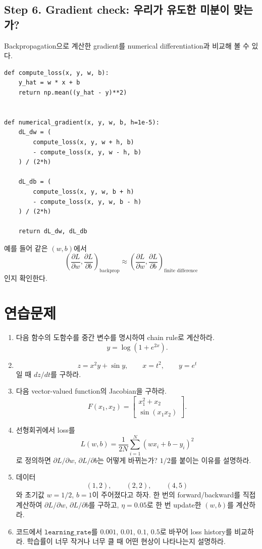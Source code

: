\documentclass[11pt,a4paper]{article}
\begin{document}
\subsection{Step 6. Gradient check: 우리가 유도한 미분이 맞는가?}

Backpropagation으로 계산한 gradient를 numerical differentiation과 비교해 볼 수 있다.

\begin{lstlisting}
def compute_loss(x, y, w, b):
    y_hat = w * x + b
    return np.mean((y_hat - y)**2)


def numerical_gradient(x, y, w, b, h=1e-5):
    dL_dw = (
        compute_loss(x, y, w + h, b)
        - compute_loss(x, y, w - h, b)
    ) / (2*h)

    dL_db = (
        compute_loss(x, y, w, b + h)
        - compute_loss(x, y, w, b - h)
    ) / (2*h)

    return dL_dw, dL_db
\end{lstlisting}

예를 들어 같은 $(w,b)$에서
\[
\left(\frac{\partial L}{\partial w},\frac{\partial L}{\partial b}\right)_{\text{backprop}}
\approx
\left(\frac{\partial L}{\partial w},\frac{\partial L}{\partial b}\right)_{\text{finite difference}}
\]
인지 확인한다.


\section{연습문제}

\begin{enumerate}[label=\textbf{\arabic*.},leftmargin=2.2em]
\item 다음 함수의 도함수를 중간 변수를 명시하여 chain rule로 계산하라.
\[
y=\log\left(1+e^{2x}\right).
\]

\item
\[
z=x^2y+\sin y,
\qquad
x=t^2,
\qquad
y=e^t
\]
일 때 $dz/dt$를 구하라.

\item 다음 vector-valued function의 Jacobian을 구하라.
\[
F(x_1,x_2)
=
\begin{bmatrix}
x_1^2+x_2\\
\sin(x_1x_2)
\end{bmatrix}.
\]

\item 선형회귀에서 loss를
\[
L(w,b)=\frac{1}{2N}\sum_{i=1}^N(wx_i+b-y_i)^2
\]
로 정의하면 $\partial L/\partial w$, $\partial L/\partial b$는 어떻게 바뀌는가?
$1/2$를 붙이는 이유를 설명하라.

\item 데이터
\[
(1,2),\qquad(2,2),\qquad(4,5)
\]
와 초기값 $w=1/2$, $b=1$이 주어졌다고 하자. 한 번의 forward/backward를 직접 계산하여
$\partial L/\partial w$, $\partial L/\partial b$를 구하고, $\eta=0.05$로 한 번 update한 $(w,b)$를 계산하라.

\item 코드에서 $\texttt{learning\_rate}$를 $0.001$, $0.01$, $0.1$, $0.5$로 바꾸어 loss history를 비교하라.
학습률이 너무 작거나 너무 클 때 어떤 현상이 나타나는지 설명하라.
\end{enumerate}
\end{document}
